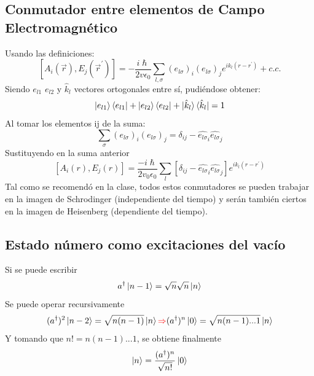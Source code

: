 \documentclass{book}
\begin{document}
    \subsection{Conmutador entre elementos de Campo Electromagnético}Usando las definiciones:
    \begin{equation}{ [A_i(\vec{r}),E_j(\vec{r}^\prime)]=-\frac{i\hslash}{2v\epsilon_0}\sum_{l,\sigma}({e}_{l\sigma})_i({e}_{l\sigma})_j e^{i{k}_l({r}-{r}^\prime)}+c.c.} \end{equation}
    Siendo ${{e}_{l1}}$ ${{e}_{l2}}$ y ${\hat{{k}}_l}$ vectores ortogonales entre sí, pudiéndose obtener:
    \begin{equation}{ \ket{{e}_{l1}}\bra{{e}_{l1}}+\ket{{e}_{l2}}\bra{{e}_{l2}}+\ket{\hat{{k}}_l}\bra{\hat{{k}}_l}=1} \end{equation}
    Al tomar los elementos ij de la suma:
    \begin{equation}{ \sum_\sigma ({e}_{l\sigma})_i({e}_{l\sigma})_j=\delta_{ij}-\hat{{e}_{l\sigma}}_i\hat{{e}_{l\sigma}}_j} \end{equation} 
    Sustituyendo en la suma anterior
    \begin{equation}{ [A_i({r}), E_j({r})]=\frac{-i\hslash}{2v_0\epsilon_0}\sum_l [\delta_{ij}-\hat{{e}_{l\sigma}}_i\hat{{e}_{l\sigma}}_j]e^{i{k}_l({r}-{r}^\prime)}} \end{equation}
    Tal como se recomendó en la clase, todos estos conmutadores se pueden trabajar en la imagen de Schrodinger (independiente del tiempo) y serán también ciertos en la imagen de Heisenberg (dependiente del tiempo).
    \subsection{Estado número como excitaciones del vacío}Si se puede escribir 
    \begin{equation}{ a^\dag\ket{n-1}=\sqrt{n}\sqrt{n}\ket{n}} \end{equation}Se puede operar recursivamente \begin{equation}{ (a^\dag)^2\ket{n-2}=\sqrt{n(n-1)}\ket{n}\textcolor{red}{\Rightarrow} (a^\dag)^n\ket{0}=\sqrt{n(n-1)...1}\ket{n}}\end{equation} Y tomando que ${n!=n(n-1)...}1 $, se obtiene finalmente \begin{equation}{ \ket{n}=\frac{(a^\dag)^n}{\sqrt{n!}}\ket{0}}\end{equation}
\end{document}
